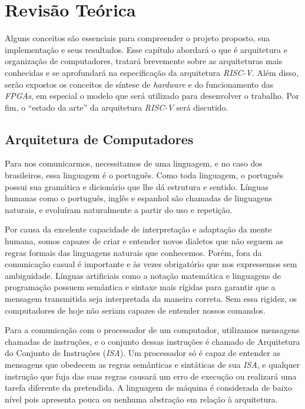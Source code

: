 \chapter{Revisão Teórica}\label{cap_revisao}
{ Alguns conceitos são essenciais para compreender o projeto proposto, sua
    implementação e seus resultados. Esse capítulo abordará o que é arquitetura
    e organização de computadores, tratará brevemente sobre as arquiteturas mais
    conhecidas e se aprofundará na especificação da arquitetura \textit{RISC-V}.
    Além disso, serão expostos os conceitos de síntese de \textit{hardware} e
    do funcionamento das \textit{FPGAs}, em especial o modelo que será utilizado
    para desenvolver o trabalho.
    Por fim, o ``estado da arte'' da arquitetura \textit{RISC-V} será discutido.
}

\section{Arquitetura de Computadores}
{ Para nos comunicarmos, necessitamos de uma linguagem, e no caso dos
    brasileiros, essa linguagem é o português. Como toda linguagem, o português
    possui sua gramática e dicionário que lhe dá estrutura e sentido. Línguas
    humanas como o português, inglês e espanhol são chamadas de linguagens
    naturais, e evoluíram naturalmente a partir do uso e
    repetição.~\cite{lyons1991natural}
}

{ Por causa da excelente capacidade de interpretação e adaptação da mente
    humana, somos capazes de criar e entender novos dialetos que não seguem as
    regras formais das linguagens naturais que conhecemos. Porém, fora da
    comunicação casual é importante e às vezes obrigatório que nos expressemos
    sem ambiguidade. Línguas artificiais como a notação matemática e linguagens
    de programação possuem semântica e sintaxe mais rígidas para garantir que
    a mensagem transmitida seja interpretada da maneira correta. Sem essa
    rigidez, os computadores de hoje não seriam capazes de entender nossos
    comandos.
}

{ Para a comunicação com o processador de um computador, utilizamos mensagens
    chamadas de instruções, e o conjunto dessas instruções é chamado de
    Arquitetura do Conjunto de Instruções (\textit{ISA}). Um processador só é
    capaz de entender as mensagens que obedecem as regras semânticas e
    sintáticas de sua \textit{ISA}, e qualquer instrução que fuja das suas
    regras causará um erro de execução ou realizará uma tarefa diferente da
    pretendida. A linguagem de máquina é considerada de baixo nível pois
    apresenta pouca ou nenhuma abstração em relação à arquitetura.
}

